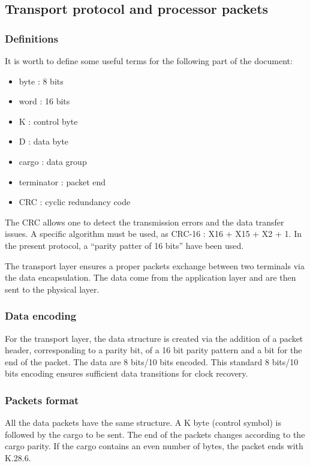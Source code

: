 \subsection{Transport protocol and processor packets}\label{chapappA::subsec::transport}
\subsubsection{Definitions}\label{chapappA::subsubsec::transpDefs}
	It is worth to define some useful terms for the following part of the document:

	\begin{itemize}
		\item byte : 8 bits
		\item word : 16 bits
		\item K : control byte
		\item D : data byte
		\item cargo : data group
		\item terminator : packet end
		\item CRC : cyclic redundancy code \newline
	\end{itemize}

The CRC allows one to detect the transmission errors and the data transfer issues. A specific algorithm must be used, as CRC-16 : X16 + X15 + X2 + 1. In the present protocol, a \enquote{parity patter of 16 bits} have been used.

The transport layer ensures a proper packets exchange between two terminals via the data encapsulation. The data come from the application layer and are then sent to the physical layer.\newline

\subsubsection{Data encoding}\label{chapappA::subsubsec::transpDataDec}
For the transport layer, the data structure is created via the addition of a packet header, corresponding to a parity bit, of a 16 bit parity pattern and a bit for the end of the packet.
The data are 8 bits/10 bits encoded. This standard 8 bits/10 bits encoding ensures sufficient data transitions for clock recovery.

\subsubsection{Packets format}\label{chapappA::subsubsec::transpPackForm}
All the data packets have the same structure. A K byte (control symbol) is followed by the cargo to be sent. The end of the packets changes according to the cargo parity.\newline
If the cargo contains an even number of bytes, the packet ends with K.28.6.

